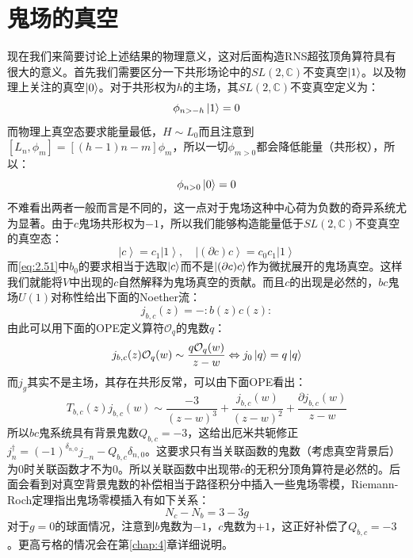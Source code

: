 \section{鬼场的真空}
现在我们来简要讨论上述结果的物理意义，这对后面构造RNS超弦顶角算符具有很大的意义。首先我们需要区分一下共形场论中的$SL(2,\mathbb{C})$不变真空$\ket{1}$。以及物理上关注的真空$\ket{0}$。对于共形权为$h$的主场，其$SL(2,\mathbb{C})$不变真空定义为：
\begin{equation}
	\phi_{n>-h}\ket{1}=0
\end{equation}
而物理上真空态要求能量最低，$H\sim L_0$而且注意到$[L_n,\phi_m]=[(h-1)n-m]\phi_m$，所以一切$\phi_{m>0}$都会降低能量（共形权），所以：
\begin{equation}
	\phi_{n>0}\ket{0}=0
\end{equation}
不难看出两者一般而言是不同的，这一点对于鬼场这种中心荷为负数的奇异系统尤为显著。由于$c$鬼场共形权为$-1$，所以我们能够构造能量低于$SL(2,\mathbb{C})$不变真空的真空态：
\begin{equation}
	\left|c\right\rangle=c_{1}\left|1\right\rangle,\quad\left|(\partial c)c\right\rangle=c_{0}c_{1}\left|1\right\rangle
\end{equation}
而\ref{eq:2.51}中$b_0$的要求相当于选取$\ket{c}$而不是$\ket{(\partial c) c}$作为微扰展开的鬼场真空。这样我们就能将$V$中出现的$c$自然解释为鬼场真空的贡献。而且$c$的出现是必然的，$bc$鬼场$U(1)$对称性给出下面的Noether流：
\begin{equation}
	\label{eq:2.63}
	j_{b,c}(z)=-:b(z)c(z):
\end{equation}
由此可以用下面的OPE定义算符$\mathcal{O}_q$的鬼数$q$：
\begin{equation}
	j_{b,c}(z)\mathcal{O}_q(w)\sim\frac{q\mathcal{O}_q(w)}{z-w}\Leftrightarrow j_0\ket{q} = q\ket{q}
\end{equation}
而$j_g$其实不是主场，其存在共形反常，可以由下面OPE看出：
\begin{equation}
	T_{b,c}(z)j_{b,c}(w)\sim\frac{-3}{(z-w)^3}+\frac{j_{b,c}(w)}{(z-w)^2}+\frac{\partial j_{b,c}(w)}{z-w}
\end{equation}
所以$bc$鬼系统具有背景鬼数$Q_{b,c}=-3$，这给出厄米共轭修正$j_n^\dagger=(-1)^{\delta_{n,0}}j_{-n}-Q_{b,c}\delta_{n,0}$。这要求只有当关联函数的鬼数（考虑真空背景后）为$0$时关联函数才不为$0$。所以关联函数中出现带$c$的无积分顶角算符是必然的。后面会看到对真空背景鬼数的补偿相当于路径积分中插入一些鬼场零模，Riemann-Roch定理指出鬼场零模插入有如下关系：
\begin{equation}
	\label{eq:2.66}
	N_c-N_b=3-3g
\end{equation}
对于$g=0$的球面情况，注意到$b$鬼数为$-1$，$c$鬼数为$+1$，这正好补偿了$Q_{b,c}=-3$。更高亏格的情况会在第\ref{chap:4}章详细说明。

